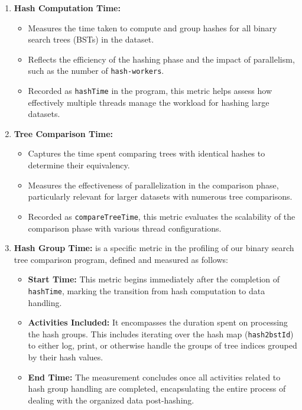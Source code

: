 \documentclass[letterpaper,12pt]{article}
\theoremstyle{remark}
\begin{document}
\begin{enumerate}
    \item \textbf{Hash Computation Time:}
    \begin{itemize}
        \item Measures the time taken to compute and group hashes for all binary search trees (BSTs) in the dataset.
        \item Reflects the efficiency of the hashing phase and the impact of parallelism, such as the number of \texttt{hash-workers}.
        \item Recorded as \texttt{hashTime} in the program, this metric helps assess how effectively multiple threads manage the workload for hashing large datasets.
    \end{itemize}

    \item \textbf{Tree Comparison Time:}
    \begin{itemize}
        \item Captures the time spent comparing trees with identical hashes to determine their equivalency.
        \item Measures the effectiveness of parallelization in the comparison phase, particularly relevant for larger datasets with numerous tree comparisons.
        \item Recorded as \texttt{compareTreeTime}, this metric evaluates the scalability of the comparison phase with various thread configurations.
    \end{itemize}
    
    
    \item \textbf{Hash Group Time:}
is a specific metric in the profiling of our binary search tree comparison program, defined and measured as follows:

\begin{itemize}
    \item \textbf{Start Time:} This metric begins immediately after the completion of \texttt{hashTime}, marking the transition from hash computation to data handling.
    \item \textbf{Activities Included:} It encompasses the duration spent on processing the hash groups. This includes iterating over the hash map (\texttt{hash2bstId}) to either log, print, or otherwise handle the groups of tree indices grouped by their hash values.
    \item \textbf{End Time:} The measurement concludes once all activities related to hash group handling are completed, encapsulating the entire process of dealing with the organized data post-hashing.
\end{itemize}

\end{enumerate}
\end{document}
